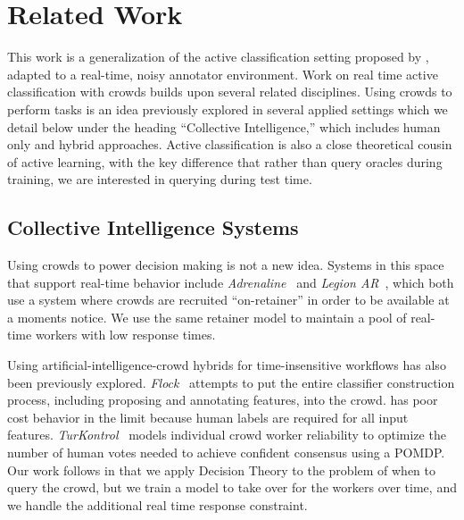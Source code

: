 \section{Related Work}
\label{sec:related}


This work is a generalization of the active classification setting proposed by \cite{greiner2002learning}, adapted to a real-time, noisy annotator environment.
Work on real time active classification with crowds builds upon several related disciplines.
Using crowds to perform tasks is an idea previously explored in several applied settings which we detail below under the heading ``Collective Intelligence,'' which includes human only and hybrid approaches.
Active classification is also a close theoretical cousin of active learning, with the key difference that rather than query oracles during training, we are interested in querying during test time.

\subsection{Collective Intelligence Systems}

Using crowds to power decision making is not a new idea. Systems in this space that support real-time behavior include \textit{Adrenaline}~\cite{bernstein2011crowds} and \textit{Legion AR}~\cite{lasecki2013real}, which both use a system where crowds are recruited ``on-retainer'' in order to be available at a moments notice.
We use the same retainer model to maintain a pool of real-time workers with low response times.

Using artificial-intelligence-crowd hybrids for time-insensitive workflows has also been previously explored.
\textit{Flock}~\cite{chengflock} attempts to put the entire classifier construction process, including proposing and annotating features, into the crowd. \cite{chengflock} has poor cost behavior in the limit because human labels are required for all input features.
\textit{TurKontrol}~\cite{peng2010decision} models individual crowd worker reliability to optimize the number of human votes needed to achieve confident consensus using a POMDP.
Our work follows \cite{peng2010decision} in that we apply Decision Theory to the problem of when to query the crowd, but we train a model to take over for the workers over time, and we handle the additional real time response constraint.

